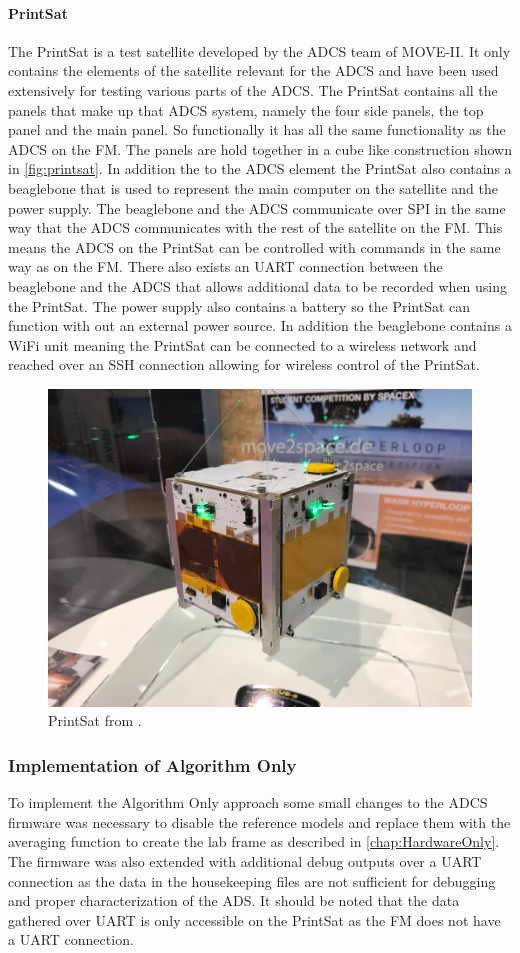\paragraph{PrintSat}
The PrintSat is a test satellite developed by the ADCS team of MOVE-II. It only contains the elements of the satellite relevant for the ADCS and have been used extensively for testing various parts of the ADCS. The PrintSat contains all the panels that make up that ADCS system, namely the four side panels, the top panel and the main panel. So functionally it has all the same functionality as the ADCS on the FM. The panels are hold together in a cube like construction shown in \autoref{fig:printsat}. In addition the to the ADCS element the PrintSat also contains a beaglebone that is used to represent the main computer on the satellite and the power supply. The beaglebone and the ADCS communicate over SPI in the same way that the ADCS communicates with the rest of the satellite on the FM. This means the ADCS on the PrintSat can be controlled with commands in the same way as on the FM. There also exists an UART connection between the beaglebone and the ADCS that allows additional data to be recorded when using the PrintSat. The power supply also contains a battery so the PrintSat can function with out an external power source. In addition the beaglebone contains a WiFi unit meaning the PrintSat can be connected to a wireless network and reached over an SSH connection allowing for wireless control of the PrintSat. 

\begin{figure}[tbp]
	\centering
	\includegraphics[width=0.5\columnwidth]{./Pictures/printsat2}
	\caption{PrintSat from \cite{DavidThesis}.}
	\label{fig:printsat}
\end{figure}

\subsubsection{Implementation of Algorithm Only}
To implement the Algorithm Only approach some small changes to the ADCS firmware was necessary to disable the reference models and replace them with the averaging function to create the lab frame as described in \autoref{chap:HardwareOnly}. The firmware was also extended with additional debug outputs over a UART connection as the data in the housekeeping files are not sufficient for debugging and proper characterization of the ADS. It should be noted that the data gathered over UART is only accessible on the PrintSat as the FM does not have a UART connection.

